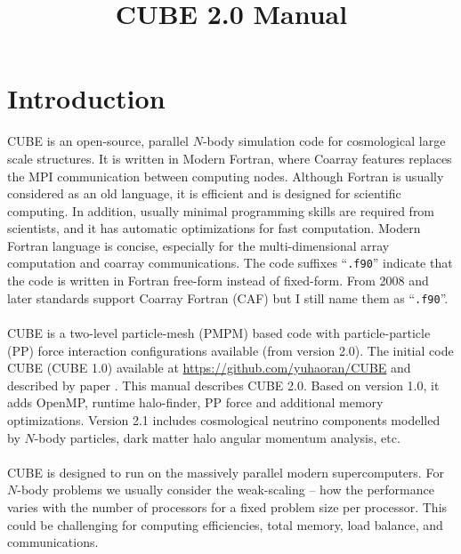 \documentclass[12pt]{article}
\date{} %
\begin{document}
\title{CUBE 2.0 Manual}


\maketitle




\tableofcontents

\section{Introduction}

CUBE is an open-source, parallel $N$-body simulation code for cosmological large scale structures. It is written in Modern Fortran, where Coarray features replaces the MPI communication between computing nodes. 
Although Fortran is usually considered as an old language, it is efficient and is designed for scientific computing. In addition, usually minimal programming skills are required from scientists, and it has automatic optimizations for fast computation. Modern Fortran language is concise, especially for the multi-dimensional array computation and coarray communications. The code suffixes ``{\tt *.f90}'' indicate that the code is written in Fortran free-form instead of fixed-form. From 2008 and later standards support Coarray Fortran (CAF) but I still name them as ``{\tt *.f90}''.
\\\\
CUBE is a two-level particle-mesh (PMPM) based code with particle-particle (PP) force interaction configurations available (from version 2.0). The initial code CUBE (CUBE 1.0) available at \url{https://github.com/yuhaoran/CUBE} and described by paper \cite{2018ApJS..237...24Y}. This manual describes CUBE 2.0. Based on version 1.0, it adds OpenMP, runtime halo-finder, PP force and additional memory optimizations. Version 2.1 includes cosmological neutrino components modelled by $N$-body particles, dark matter halo angular momentum analysis, etc.
\\\\
CUBE is designed to run on the massively parallel modern supercomputers. For $N$-body problems we usually consider the weak-scaling -- how the performance varies with the number of processors for a fixed problem size per processor. This could be challenging for computing efficiencies, total memory, load balance, and communications. 
\end{document}
